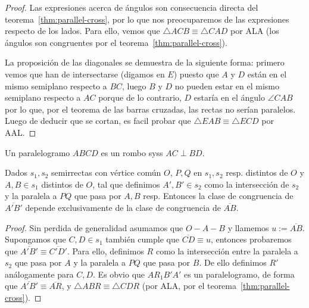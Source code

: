 \documentclass[11pt,a4paper]{book}
\begin{document}
\begin{proof}
Las expresiones acerca de ángulos son consecuencia directa del teorema~\ref{thm:parallel-cross}, por lo que nos preocuparemos de las expresiones respecto de los lados. Para ello, vemos que $\triangle ACB\equiv\triangle CAD$ por ALA (los ángulos son congruentes por el teorema~\ref{thm:parallel-cross}).
\begin{figure}
\centering
{}
\caption{}
\end{figure}

La proposición de las diagonales se demuestra de la siguiente forma: primero vemos que han de intersectarse (digamos en $E$) puesto que $A$ y $D$ están en el mismo semiplano respecto a $BC$, luego $B$ y $D$ no pueden estar en el mismo semiplano respecto a $AC$ porque de lo contrario, $D$ estaría en el ángulo $\angle CAB$ por lo que, por el teorema de las barras cruzadas, las rectas no serían paralelos. Luego de deducir que se cortan, es facil probar que $\triangle EAB\equiv\triangle ECD$ por AAL.
\end{proof}
\begin{prop}
Un paralelogramo $ABCD$ es un rombo syss $AC\perp BD$.
\end{prop}
\begin{lem}\label{thm:lemma-for-thales}
Dados $s_1,s_2$ semirrectas con vértice común $O$, $P,Q$ en $s_1,s_2$ resp. distintos de $O$ y $A,B\in s_1$ distintos de $O$, tal que definimos $A',B'\in s_2$ como la intersección de $s_2$ y la paralela a $PQ$ que pasa por $A,B$ resp. Entonces la clase de congruencia de $\overline{A'B'}$ depende exclusivamente de la clase de congruencia de $\overline{AB}$.
\end{lem}
\begin{proof}
Sin perdida de generalidad asumamos que $O-A-B$ y llamemos $u:=\overline{AB}$. Supongamos que $C,D\in s_1$ también cumple que $\overline{CD}\equiv u$, entonces probaremos que $\overline{A'B'}\equiv\overline{C'D'}$. Para ello, definimos $R$ como la intersección entre la paralela a $s_2$ que pasa por $A$ y la paralela a $PQ$ que pasa por $B$. De ello definimos $R'$ análogamente para $C,D$. Es obvio que $AR_1B'A'$ es un paralelogramo, de forma que $\overline{A'B'}\equiv\overline{AR}$, y $\triangle ABR\equiv\triangle CDR$ (por ALA, por el teorema~\ref{thm:parallel-cross}).
\end{proof}
\end{document}
